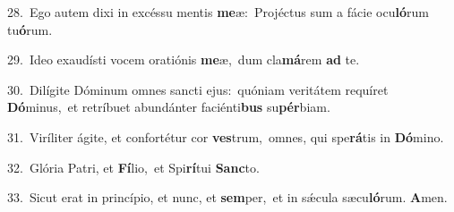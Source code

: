 {\numbfont\textcolor{\numbcolor}{28.}}~Ego autem dixi in excéssu mentis \textbf{me}\-æ:~\star Projéctus sum a fácie ocu\-\textbf{ló}\-rum tu\-\textbf{ó}\-rum.\par
{\numbfont\textcolor{\numbcolor}{29.}}~Ideo exaudísti vocem oratiónis \textbf{me}\-æ,~\star dum cla\-\textbf{má}\-rem \textbf{ad} te.\par
{\numbfont\textcolor{\numbcolor}{30.}}~Dilígite Dóminum omnes sancti ejus:~\dagger quóniam veritátem requíret \textbf{Dó}\-minus,~\star et retríbuet abundánter faciénti\textbf{bus} su\-\textbf{pér}\-biam.\par
{\numbfont\textcolor{\numbcolor}{31.}}~Viríliter ágite, et confortétur cor \textbf{ves}\-trum,~\star omnes, qui spe\-\textbf{rá}\-tis in \textbf{Dó}\-mino.\par
{\numbfont\textcolor{\numbcolor}{32.}}~Glória Patri, et \textbf{Fí}\-lio,~\star et Spi\-\textbf{rí}\-tui \textbf{Sanc}\-to.\par
{\numbfont\textcolor{\numbcolor}{33.}}~Sicut erat in princípio, et nunc, et \textbf{sem}\-per,~\star et in sǽcula sæcu\-\textbf{ló}\-rum. \textbf{A}\-men.\par
